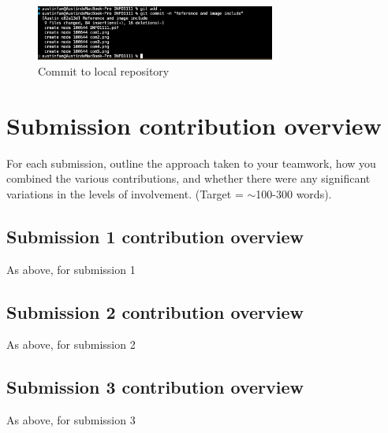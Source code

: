 \documentclass[a4paper, 11pt]{report}
\begin{document}
\begin{figure}[H]
    \centering
    \includegraphics[width=0.7\textwidth]{git1}
    \caption{Commit to local repository}
\end{figure}


\newpage
\section{Submission contribution overview}

For each submission, outline the approach taken to your teamwork, how you combined the various contributions, and whether there were any significant variations in the levels of involvement. (Target = $\sim$100-300 words).

\subsection{Submission 1 contribution overview}

As above, for submission 1

\subsection{Submission 2 contribution overview}

As above, for submission 2

\subsection{Submission 3 contribution overview}

As above, for submission 3



\newpage



\end{document}
